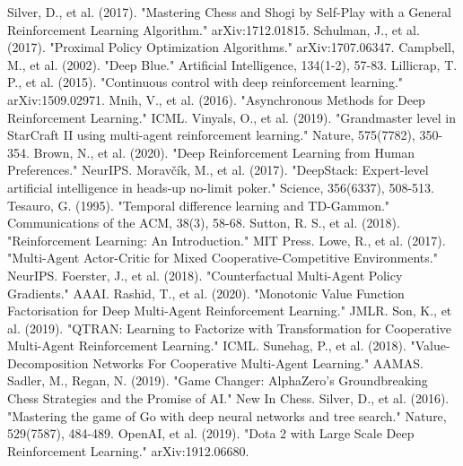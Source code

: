 \documentclass[conference]{IEEEtran}
\begin{document}
\begin{thebibliography}{00}
 Silver, D., et al. (2017). "Mastering Chess and Shogi by Self-Play with a General Reinforcement Learning Algorithm." arXiv:1712.01815.
 Schulman, J., et al. (2017). "Proximal Policy Optimization Algorithms." arXiv:1707.06347.
 Campbell, M., et al. (2002). "Deep Blue." Artificial Intelligence, 134(1-2), 57-83.
 Lillicrap, T. P., et al. (2015). "Continuous control with deep reinforcement learning." arXiv:1509.02971.
 Mnih, V., et al. (2016). "Asynchronous Methods for Deep Reinforcement Learning." ICML.
 Vinyals, O., et al. (2019). "Grandmaster level in StarCraft II using multi-agent reinforcement learning." Nature, 575(7782), 350-354.
 Brown, N., et al. (2020). "Deep Reinforcement Learning from Human Preferences." NeurIPS.
 Moravčík, M., et al. (2017). "DeepStack: Expert-level artificial intelligence in heads-up no-limit poker." Science, 356(6337), 508-513.
 Tesauro, G. (1995). "Temporal difference learning and TD-Gammon." Communications of the ACM, 38(3), 58-68.
 Sutton, R. S., et al. (2018). "Reinforcement Learning: An Introduction." MIT Press.
 Lowe, R., et al. (2017). "Multi-Agent Actor-Critic for Mixed Cooperative-Competitive Environments." NeurIPS.
 Foerster, J., et al. (2018). "Counterfactual Multi-Agent Policy Gradients." AAAI.
 Rashid, T., et al. (2020). "Monotonic Value Function Factorisation for Deep Multi-Agent Reinforcement Learning." JMLR.
 Son, K., et al. (2019). "QTRAN: Learning to Factorize with Transformation for Cooperative Multi-Agent Reinforcement Learning." ICML.
 Sunehag, P., et al. (2018). "Value-Decomposition Networks For Cooperative Multi-Agent Learning." AAMAS.
 Sadler, M., Regan, N. (2019). "Game Changer: AlphaZero's Groundbreaking Chess Strategies and the Promise of AI." New In Chess.
 Silver, D., et al. (2016). "Mastering the game of Go with deep neural networks and tree search." Nature, 529(7587), 484-489.
 OpenAI, et al. (2019). "Dota 2 with Large Scale Deep Reinforcement Learning." arXiv:1912.06680.
\end{thebibliography}
\end{document}
